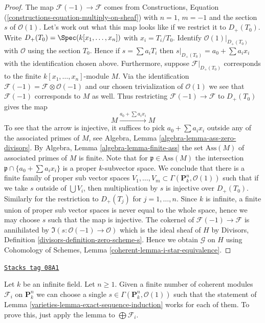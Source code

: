 \begin{proof}
The map $\mathcal{F}(-1) \to \mathcal{F}$ comes from
Constructions, Equation (\ref{constructions-equation-multiply-on-sheaf})
with $n = 1$, $m = -1$ and the section $s$ of $\mathcal{O}(1)$.
Let's work out what this map looks like if we restrict it to
$D_{+}(T_0)$. Write $D_{+}(T_0) = \Spec(k[x_1, \ldots, x_n])$
with $x_i = T_i/T_0$. Identify $\mathcal{O}(1)|_{D_{+}(T_0)}$ with
$\mathcal{O}$ using the section $T_0$. Hence if
$s = \sum a_iT_i$ then $s|_{D_{+}(T_0)} = a_0 + \sum a_ix_i$
with the identification chosen above. Furthermore, suppose
$\mathcal{F}|_{D_{+}(T_0)}$ corresponds to the finite
$k[x_1, \ldots, x_n]$-module $M$. Via the identification
$\mathcal{F}(-1) = \mathcal{F} \otimes \mathcal{O}(-1)$
and our chosen trivialization of $\mathcal{O}(1)$ we see that
$\mathcal{F}(-1)$ corresponds to $M$ as well. Thus
restricting $\mathcal{F}(-1) \to \mathcal{F}$ to $D_{+}(T_0)$ gives
the map
$$
M \xrightarrow{a_0 + \sum a_ix_i} M
$$
To see that the arrow is injective, it suffices to pick
$a_0 + \sum a_ix_i$ outside any of the associated primes of $M$, see
Algebra, Lemma \ref{algebra-lemma-ass-zero-divisors}. By
Algebra, Lemma \ref{algebra-lemma-finite-ass}
the set $\text{Ass}(M)$ of associated primes of $M$ is finite.
Note that for $\mathfrak p \in \text{Ass}(M)$ the intersection
$\mathfrak p \cap \{a_0 + \sum a_i x_i\}$ is a proper $k$-subvector space.
We conclude that there is a finite family of proper sub vector spaces
$V_1, \ldots, V_m \subset \Gamma(\mathbf{P}^n_k, \mathcal{O}(1))$
such that if we take $s$ outside of $\bigcup V_i$, then multiplication
by $s$ is injective over $D_{+}(T_0)$.
Similarly for the restriction to $D_{+}(T_j)$ for $j = 1, \ldots, n$.
Since $k$ is infinite, a finite union of proper sub vector spaces
is never equal to the whole space, hence we may choose $s$ such
that the map is injective.
The cokernel of $\mathcal{F}(-1) \to \mathcal{F}$ is annihilated
by $\Im(s : \mathcal{O}(-1) \to \mathcal{O})$ which is
the ideal sheaf of $H$ by
Divisors, Definition \ref{divisors-definition-zero-scheme-s}.
Hence we obtain $\mathcal{G}$ on $H$ using
Cohomology of Schemes, Lemma \ref{coherent-lemma-i-star-equivalence}.
\end{proof}

\begin{remark}
\label{varieties-remark-exact-sequence-induction}
\href{https://stacks.math.columbia.edu/tag/08A1}{\texttt{Stacks tag 08A1}}

Let $k$ be an infinite field. Let $n \geq 1$. Given a finite number
of coherent modules $\mathcal{F}_i$ on $\mathbf{P}^n_k$ we can choose
a single $s \in \Gamma(\mathbf{P}^n_k, \mathcal{O}(1))$ such
that the statement of Lemma \ref{varieties-lemma-exact-sequence-induction}
works for each of them.
To prove this, just apply the lemma to $\bigoplus \mathcal{F}_i$.
\end{remark}

